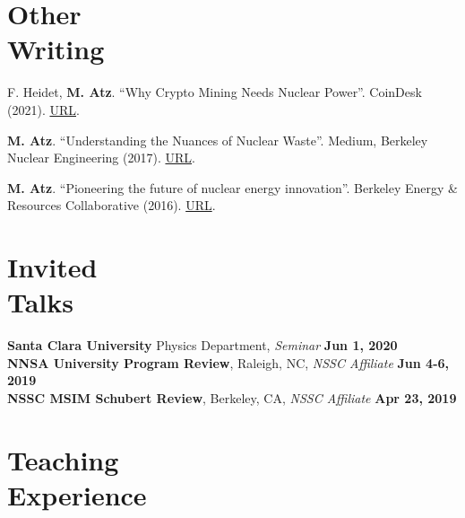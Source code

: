 \documentclass[margin,line]{resume}
\begin{document}
\begin{resume}
\begin{bibenum}
\end{bibenum}
\section{\mysidestyle Other\\Writing}
\begin{bibenum}

    \item F. Heidet, \textbf{M. Atz}. ``Why Crypto Mining Needs Nuclear Power''. CoinDesk (2021). \href{https://www.coindesk.com/policy/2021/10/13/why-crypto-mining-needs-nuclear-power/}{URL}.
    
    \item \textbf{M. Atz}. ``Understanding the Nuances of Nuclear Waste''. Medium, Berkeley Nuclear Engineering (2017). \href{https://medium.com/berkeley-nuclear-engineering/understanding-the-nuances-of-nuclear-waste-5c123ba4211f}{URL}.
    
    \item \textbf{M. Atz}. ``Pioneering the future of nuclear energy innovation''. Berkeley Energy \& Resources Collaborative (2016). \href{http://berc.berkeley.edu/pioneering-future-nuclear-energy-innovation/}{URL}.
\end{bibenum}

\vspace{8mm}
\section{\mysidestyle Invited\\Talks}
\textbf{Santa Clara University} Physics Department, \textsl{Seminar} \hfill \textbf{Jun 1, 2020}\\
\textbf{NNSA University Program Review}, Raleigh, NC, \textsl{NSSC Affiliate} \hfill \textbf{Jun 4-6, 2019}\\
\textbf{NSSC MSIM Schubert Review}, Berkeley, CA, \textsl{NSSC Affiliate} \hfill \textbf{Apr 23, 2019}\\

\section{\mysidestyle Teaching\\Experience}


\end{resume}
\end{document}
